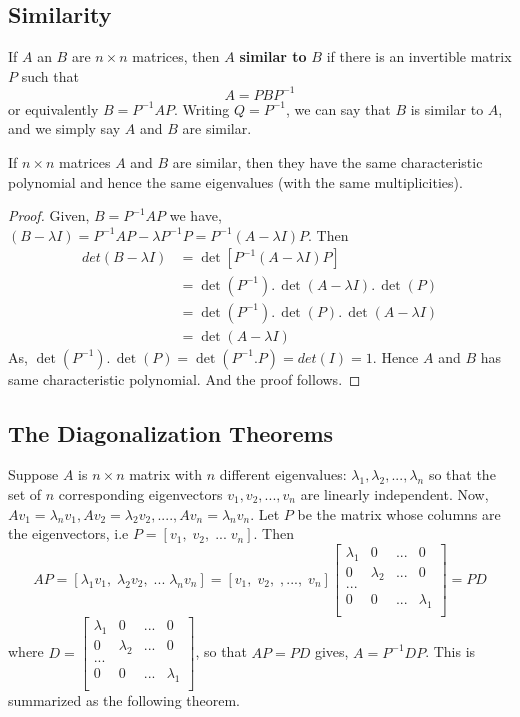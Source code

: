 \documentclass[aima104_lecturenotes_ku.tex]{subfiles}
\begin{document}
\subsection{Similarity}
If $A$ an $B$ are $n \times n$ matrices, then $A$ \textbf{similar to} $B$ if there is an invertible matrix $P$ such that $$A = PBP^{-1}$$ or equivalently $B=P^{-1}AP$. Writing $Q=P^{-1}$, we can say that $B$ is similar to $A$, and we simply say $A$ and $B$ are similar.
\begin{theorem}
  If $n \times n$ matrices $A$ and $B$ are similar, then they have the same characteristic polynomial and hence the same eigenvalues (with the same multiplicities).
\end{theorem}
\begin{proof}
 \hspace{1cm} Given, $B=P^{-1}AP$ we have, $(B-\lambda I) = P^{-1}AP - \lambda P^{-1}P = P^{-1}(A- \lambda I) P$. Then
    \begin{align*}
      det(B-\lambda I) &= \det[P^{-1}(A- \lambda I) P] \\
                       &= \det(P^{-1}).\, \det(A- \lambda I).\, \det(P) \\
                       &= \det(P^{-1}).\, \det(P). \, \det(A- \lambda I) \\
                       &= \det(A- \lambda I)
    \end{align*}
  As, $\det(P^{-1}).\, \det(P) = \det(P^{-1}.P)=det(I) = 1$. Hence $A$ and $B$ has same characteristic polynomial. And the proof follows.
\end{proof}
\subsection{The Diagonalization Theorems}
Suppose $A$ is $n \times n$ matrix with $n$ different eigenvalues: $\lambda_1, \lambda_2, ..., \lambda_n$ so that the set of $n$ corresponding eigenvectors $v_1, v_2, ..., v_n$ are linearly independent. Now, $Av_1=\lambda _n v_1, Av_2=\lambda _2 v_2, ...., Av_n = \lambda _n v_n$. Let $P$ be the matrix whose columns are the eigenvectors, i.e $P = [v_1, \; v_2, \; ... \; v_n] $. Then
\begin{equation}
  \label{eq:1}
AP = [\lambda _1 v_1, \; \lambda_2 v_2, \; ... \; \lambda_n v_n] =
 [v_1, \; v_2, \; , ..., \; v_n] \begin{bmatrix}
  \lambda_1 & 0 & ... & 0 \\
  0 & \lambda_2 & ... & 0 \\
  ... \\
  0 & 0 & ... & \lambda_1 \\
\end{bmatrix} = PD
\end{equation}
where $ D = \begin{bmatrix}
  \lambda_1 & 0 & ... & 0 \\
  0 & \lambda_2 & ... & 0 \\
  ... \\
  0 & 0 & ... & \lambda_1 \\
\end{bmatrix} $, so that $AP = PD$ gives, $A = P^{-1} D P$. This is summarized as the following theorem.
\end{document}
